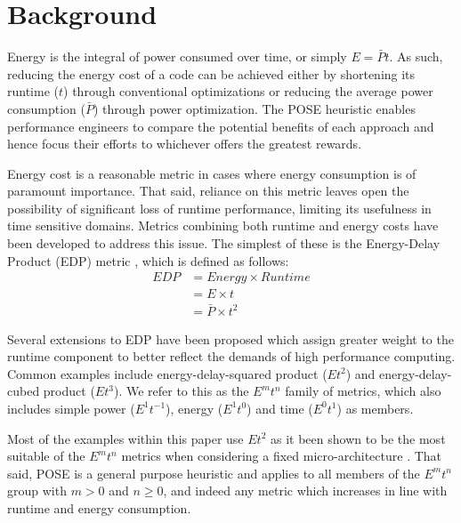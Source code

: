 \section{Background}
\label{sec:background}

Energy is the integral of power consumed over time, or simply $E = \bar{P}t$.
As such, reducing the energy cost of a code can be achieved either by shortening its runtime ($t$) through conventional optimizations or reducing the average power consumption ($\bar{P}$) through power optimization.
The POSE heuristic enables performance engineers to compare the potential benefits of each approach and hence focus their efforts to whichever offers the greatest rewards.

Energy cost is a reasonable metric in cases where energy consumption is of paramount importance.
That said, reliance on this metric leaves open the possibility of significant loss of runtime performance, limiting its usefulness in time sensitive domains.
Metrics combining both runtime and energy costs have been developed to address this issue. 
The simplest of these is the Energy-Delay Product (EDP) metric \cite{gonzales:1995aa}, which is defined as follows:
\begin{align}
  EDP &= Energy \times Runtime \nonumber \\
      &= E \times t \nonumber \\
      &= \bar{P} \times t^2
  \label{eq:edp}
\end{align}

Several extensions to EDP have been proposed which assign greater weight to the runtime component to better reflect the demands of high performance computing.
Common examples include energy-delay-squared product ($Et^{2}$) and energy-delay-cubed product ($Et^{3}$).
We refer to this as the $E^mt^n$ family of metrics, which also includes simple power ($E^1t^{-1}$), energy ($E^1t^0$) and time ($E^0t^1$) as members.

Most of the examples within this paper use $Et^2$ as it been shown to be the most suitable of the $E^mt^n$ metrics when considering a fixed micro-architecture \cite{brooks:2000aa}.
That said, POSE is a general purpose heuristic and applies to all members of the $E^mt^n$ group with $m > 0$ and $n \geq 0$, and indeed any metric which increases in line with runtime and energy consumption.
